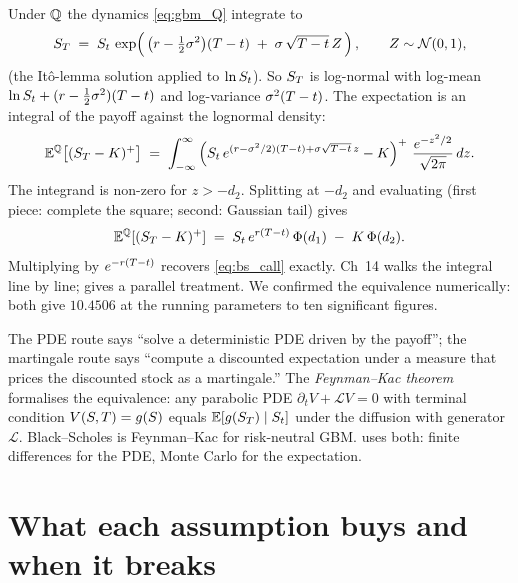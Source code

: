 Under $\mathbb{Q}$ the dynamics \eqref{eq:gbm_Q} integrate to
\begin{equation}
  S_T \;=\; S_t\,\exp\!\left(\,
    \bigl(r - \tfrac{1}{2}\sigma^2\bigr)(T - t)
    \;+\; \sigma\,\sqrt{T - t}\,Z\,\right),
  \qquad Z \sim \mathcal{N}(0, 1),
  \label{eq:ST_lognormal}
\end{equation}
(the It\^o-lemma solution applied to $\ln S_t$). So $S_T$
is log-normal with log-mean $\ln S_t + (r - \tfrac12\sigma^2)
(T - t)$ and log-variance $\sigma^2(T - t)$. The
expectation is an integral of the payoff against the lognormal
density:
\begin{equation*}
  \mathbb{E}^{\mathbb{Q}}\!\left[(S_T - K)^+\right]
  \;=\; \int_{-\infty}^{\infty}
        \left(S_t\,e^{(r - \sigma^2/2)(T-t)
                          + \sigma\sqrt{T-t}\,z} - K\right)^+
        \,\frac{e^{-z^2/2}}{\sqrt{2\pi}}\,dz.
\end{equation*}
The integrand is non-zero for $z > -d_2$. Splitting at $-d_2$
and evaluating (first piece: complete the square; second:
Gaussian tail) gives
\begin{equation*}
  \mathbb{E}^{\mathbb{Q}}[(S_T - K)^+]
  \;=\; S_t\,e^{r(T - t)}\,\Phi(d_1)
       \;-\; K\,\Phi(d_2).
\end{equation*}
Multiplying by $e^{-r(T - t)}$ recovers \eqref{eq:bs_call}
exactly. \citeHull{} Ch~14 walks the integral line by line;
\citep{mit18S096} gives a parallel treatment. We confirmed the
equivalence numerically: both give $10.4506$ at the running
parameters to ten significant figures.

\begin{intuitionbox}
The PDE route says ``solve a deterministic PDE driven by the
payoff''; the martingale route says ``compute a discounted
expectation under a measure that prices the discounted stock
as a martingale.'' The \emph{Feynman--Kac theorem} formalises
the equivalence: any parabolic PDE
$\partial_t V + \mathcal L V = 0$ with terminal condition
$V(S, T) = g(S)$ equals
$\mathbb{E}[g(S_T) \mid S_t]$ under the diffusion with generator
$\mathcal L$. Black--Scholes is Feynman--Kac for risk-neutral
GBM.  uses both: finite differences
for the PDE, Monte Carlo for the expectation.
\end{intuitionbox}

\section{What each assumption buys and when it breaks}
\label{sec:ch15_assumptions_break}

